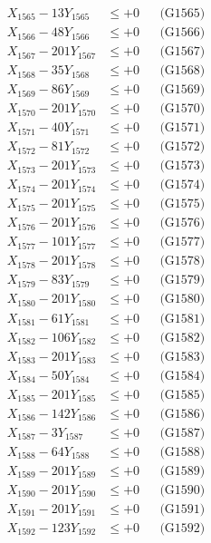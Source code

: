 \documentclass[a4paper,10pt]{article}
\begin{document}
{\begin{align}
X_{1565} - 13Y_{1565} &\leq +0 && \text{(G1565)} \\
X_{1566} - 48Y_{1566} &\leq +0 && \text{(G1566)} \\
X_{1567} - 201Y_{1567} &\leq +0 && \text{(G1567)} \\
X_{1568} - 35Y_{1568} &\leq +0 && \text{(G1568)} \\
X_{1569} - 86Y_{1569} &\leq +0 && \text{(G1569)} \\
X_{1570} - 201Y_{1570} &\leq +0 && \text{(G1570)} \\
\allowbreak
X_{1571} - 40Y_{1571} &\leq +0 && \text{(G1571)} \\
X_{1572} - 81Y_{1572} &\leq +0 && \text{(G1572)} \\
X_{1573} - 201Y_{1573} &\leq +0 && \text{(G1573)} \\
X_{1574} - 201Y_{1574} &\leq +0 && \text{(G1574)} \\
X_{1575} - 201Y_{1575} &\leq +0 && \text{(G1575)} \\
X_{1576} - 201Y_{1576} &\leq +0 && \text{(G1576)} \\
X_{1577} - 101Y_{1577} &\leq +0 && \text{(G1577)} \\
X_{1578} - 201Y_{1578} &\leq +0 && \text{(G1578)} \\
X_{1579} - 83Y_{1579} &\leq +0 && \text{(G1579)} \\
X_{1580} - 201Y_{1580} &\leq +0 && \text{(G1580)} \\
\allowbreak
X_{1581} - 61Y_{1581} &\leq +0 && \text{(G1581)} \\
X_{1582} - 106Y_{1582} &\leq +0 && \text{(G1582)} \\
X_{1583} - 201Y_{1583} &\leq +0 && \text{(G1583)} \\
X_{1584} - 50Y_{1584} &\leq +0 && \text{(G1584)} \\
X_{1585} - 201Y_{1585} &\leq +0 && \text{(G1585)} \\
X_{1586} - 142Y_{1586} &\leq +0 && \text{(G1586)} \\
X_{1587} - 3Y_{1587} &\leq +0 && \text{(G1587)} \\
X_{1588} - 64Y_{1588} &\leq +0 && \text{(G1588)} \\
X_{1589} - 201Y_{1589} &\leq +0 && \text{(G1589)} \\
X_{1590} - 201Y_{1590} &\leq +0 && \text{(G1590)} \\
\allowbreak
X_{1591} - 201Y_{1591} &\leq +0 && \text{(G1591)} \\
X_{1592} - 123Y_{1592} &\leq +0 && \text{(G1592)} \\

\end{align}}
\end{document}
